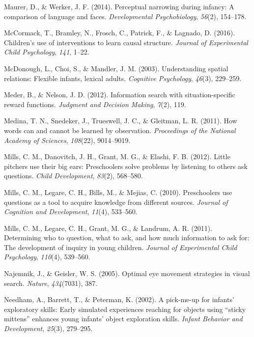 \documentclass[english,floatsintext,man]{apa6}
\theoremstyle{definition}
\theoremstyle{definition}
\theoremstyle{definition}
\theoremstyle{remark}
\begin{document}
\hypertarget{ref-maurer2014perceptual}{}
Maurer, D., \& Werker, J. F. (2014). Perceptual narrowing during
infancy: A comparison of language and faces. \emph{Developmental
Psychobiology}, \emph{56}(2), 154--178.

\hypertarget{ref-mccormack2016children}{}
McCormack, T., Bramley, N., Frosch, C., Patrick, F., \& Lagnado, D.
(2016). Children's use of interventions to learn causal structure.
\emph{Journal of Experimental Child Psychology}, \emph{141}, 1--22.

\hypertarget{ref-mcdonough2003understanding}{}
McDonough, L., Choi, S., \& Mandler, J. M. (2003). Understanding spatial
relations: Flexible infants, lexical adults. \emph{Cognitive
Psychology}, \emph{46}(3), 229--259.

\hypertarget{ref-meder2012information}{}
Meder, B., \& Nelson, J. D. (2012). Information search with
situation-specific reward functions. \emph{Judgment and Decision
Making}, \emph{7}(2), 119.

\hypertarget{ref-medina2011words}{}
Medina, T. N., Snedeker, J., Trueswell, J. C., \& Gleitman, L. R.
(2011). How words can and cannot be learned by observation.
\emph{Proceedings of the National Academy of Sciences}, \emph{108}(22),
9014--9019.

\hypertarget{ref-mills2012little}{}
Mills, C. M., Danovitch, J. H., Grant, M. G., \& Elashi, F. B. (2012).
Little pitchers use their big ears: Preschoolers solve problems by
listening to others ask questions. \emph{Child Development},
\emph{83}(2), 568--580.

\hypertarget{ref-mills2010preschoolers}{}
Mills, C. M., Legare, C. H., Bills, M., \& Mejias, C. (2010).
Preschoolers use questions as a tool to acquire knowledge from different
sources. \emph{Journal of Cognition and Development}, \emph{11}(4),
533--560.

\hypertarget{ref-mills2011determining}{}
Mills, C. M., Legare, C. H., Grant, M. G., \& Landrum, A. R. (2011).
Determining who to question, what to ask, and how much information to
ask for: The development of inquiry in young children. \emph{Journal of
Experimental Child Psychology}, \emph{110}(4), 539--560.

\hypertarget{ref-najemnik2005optimal}{}
Najemnik, J., \& Geisler, W. S. (2005). Optimal eye movement strategies
in visual search. \emph{Nature}, \emph{434}(7031), 387.

\hypertarget{ref-needham2002pick}{}
Needham, A., Barrett, T., \& Peterman, K. (2002). A pick-me-up for
infants' exploratory skills: Early simulated experiences reaching for
objects using ``sticky mittens'' enhances young infants' object
exploration skills. \emph{Infant Behavior and Development},
\emph{25}(3), 279--295.
\end{document}
